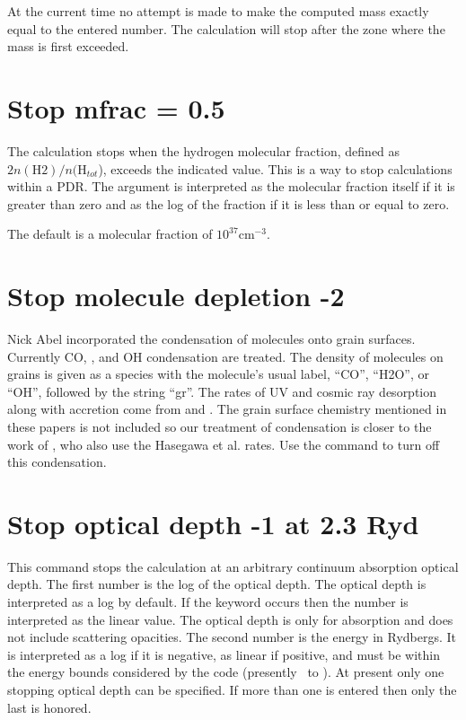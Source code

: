 At the current time no attempt is made to make the computed mass exactly
equal to the entered number.
The calculation will stop after the zone where
the mass is first exceeded.

\section{Stop mfrac = 0.5}

The calculation stops when the hydrogen molecular fraction, defined as
$2n(\mathrm{H}2)/n(\mathrm{H}_{tot}$), exceeds the indicated value.
This is a way to stop
calculations within a PDR.
The argument is interpreted as the molecular
fraction itself if it is greater than zero and as the log of the fraction
if it is less than or equal to zero.

The default is a molecular fraction of $10^{37} \mathrm{cm}^{-3}$.

\section{Stop molecule depletion -2}

Nick Abel incorporated the condensation of molecules onto grain surfaces.
Currently CO, \water, and OH condensation are treated.
The density of molecules
on grains is given as a species with the molecule's usual label, ``CO'',
``H2O'', or ``OH'', followed by the string ``gr''.
The rates of UV and
cosmic ray desorption along with accretion come from \citet{Hasegawa1992} and \citet{Hasegawa1993}.
The grain surface chemistry
mentioned in these papers is not included so our treatment of condensation
is closer to the work of \citet{Bergin1995}, who also use
the Hasegawa et al. rates.
Use the  command
to turn off this condensation.

\section{Stop optical depth -1 at 2.3 Ryd}

This command stops the calculation at an arbitrary continuum absorption
optical depth.
The first number is the log of the optical depth.
The optical depth is interpreted as a log by default.
If the  keyword
occurs then the number is interpreted as the linear value.
The optical
depth is only for absorption and does not include scattering opacities.
The second number is the energy in Rydbergs.
It is interpreted as a log
if it is negative, as linear if positive, and must be within the energy
bounds considered by the code (presently \emm\ to
\egamry).
At present only one stopping optical depth can be specified.
If more than
one is entered then only the last is honored.

